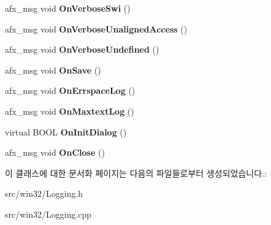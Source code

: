\begin{DoxyCompactItemize}
afx\+\_\+msg void {\bfseries On\+Verbose\+Swi} ()
\item 
\mbox{\label{class_logging_ab6beb507c8821168ba87abc732eb6ca1}} 
afx\+\_\+msg void {\bfseries On\+Verbose\+Unaligned\+Access} ()
\item 
\mbox{\label{class_logging_a7b4d1fd1026a4b1746f83847b0aee17e}} 
afx\+\_\+msg void {\bfseries On\+Verbose\+Undefined} ()
\item 
\mbox{\label{class_logging_ae00d039caa8724e18442bb7beaf8457c}} 
afx\+\_\+msg void {\bfseries On\+Save} ()
\item 
\mbox{\label{class_logging_afe62d9f99dd8178d053c88adb90fc120}} 
afx\+\_\+msg void {\bfseries On\+Errspace\+Log} ()
\item 
\mbox{\label{class_logging_a4d292fcd815e0ea21894c4ff08b4a4f8}} 
afx\+\_\+msg void {\bfseries On\+Maxtext\+Log} ()
\item 
\mbox{\label{class_logging_a5a0a6200a3d55702597a73f7fe8794f5}} 
virtual B\+O\+OL {\bfseries On\+Init\+Dialog} ()
\item 
\mbox{\label{class_logging_a25fa65fba20c90cf095583abc29318e7}} 
afx\+\_\+msg void {\bfseries On\+Close} ()
\end{DoxyCompactItemize}


이 클래스에 대한 문서화 페이지는 다음의 파일들로부터 생성되었습니다.\+:\begin{DoxyCompactItemize}
\item 
src/win32/Logging.\+h\item 
src/win32/Logging.\+cpp\end{DoxyCompactItemize}
